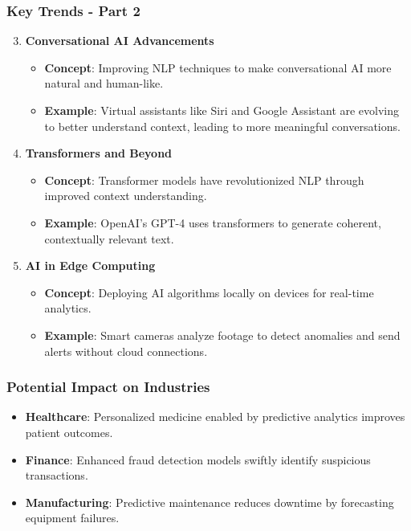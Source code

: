 \documentclass{beamer}
\begin{document}
\begin{frame}[fragile]
    \frametitle{Key Trends - Part 2}
    \begin{enumerate}
        \setcounter{enumi}{2} %
        \item \textbf{Conversational AI Advancements}
        \begin{itemize}
            \item \textbf{Concept}: Improving NLP techniques to make conversational AI more natural and human-like.
            \item \textbf{Example}: Virtual assistants like Siri and Google Assistant are evolving to better understand context, leading to more meaningful conversations.
        \end{itemize}

        \item \textbf{Transformers and Beyond}
        \begin{itemize}
            \item \textbf{Concept}: Transformer models have revolutionized NLP through improved context understanding.
            \item \textbf{Example}: OpenAI's GPT-4 uses transformers to generate coherent, contextually relevant text.
        \end{itemize}

        \item \textbf{AI in Edge Computing}
        \begin{itemize}
            \item \textbf{Concept}: Deploying AI algorithms locally on devices for real-time analytics.
            \item \textbf{Example}: Smart cameras analyze footage to detect anomalies and send alerts without cloud connections.
        \end{itemize}
    \end{enumerate}
\end{frame}

\begin{frame}[fragile]
    \frametitle{Potential Impact on Industries}
    \begin{itemize}
        \item \textbf{Healthcare}: Personalized medicine enabled by predictive analytics improves patient outcomes.
        \item \textbf{Finance}: Enhanced fraud detection models swiftly identify suspicious transactions.
        \item \textbf{Manufacturing}: Predictive maintenance reduces downtime by forecasting equipment failures.
    \end{itemize}
\end{frame}
\end{document}
